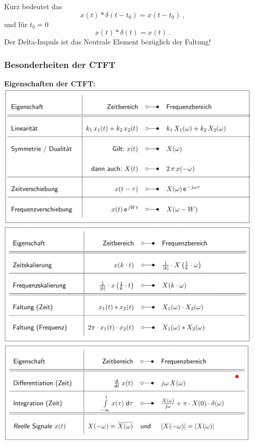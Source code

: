 \documentclass[12pt,a4paper]{scrartcl}
\begin{document}
\noindent    Kurz bedeutet das
    $$x(t) * \delta(t-t_0) = x(t-t_0)\ ,$$
    und für $t_0 = 0$
    $$x(t) * \delta(t) = x(t)\ .$$
    \noindent Der Delta-Impuls ist das Neutrale Element bezüglich der Faltung!

  \subsubsection{Besonderheiten der CTFT}
  \label{sec:sub:sub:besonderheiten-ctft}

  \noindent \textbf{Eigenschaften der CTFT:}\\
  \includegraphics[height = 7cm]{Pictures/EigenschaftenCTFT.png}\\
  \includegraphics[height = 6cm]{Pictures/EigenschaftenCTFT2.png}\\
  \includegraphics[height = 5cm]{Pictures/EigenschaftenCTFT3.png} \\
\end{document}
